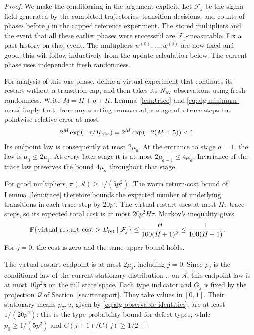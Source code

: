 \begin{proof}
We make the conditioning in the argument explicit.  Let
\(\mathcal F_j\) be the sigma-field generated by the completed
trajectories, transition decisions, and counts of phases before
\(j\) in the capped reference experiment.  The stored multipliers
and the event that all these earlier phases were successful are
\(\mathcal F_j\)-measurable.  Fix a past history on that event.
The multipliers \(w^{(0)},\ldots,w^{(j)}\) are now fixed and good;
this will follow inductively from the update calculation below.
The current phase uses independent fresh randomness.

For analysis of this one phase, define a virtual experiment that
continues its restart without a transition cap, and then takes its
\(N_{\rm av}\) observations using fresh randomness.  Write
\(M=H+p+K\).  Lemma~\ref{lem:trace} and
\eqref{eq:alg-minimum-mass} imply that, from any starting
transversal, a stage of \(\tau\) trace steps has pointwise relative
error at most
\[
 2^M\exp(-\tau/K_{\rm obs})
 =2^M\exp(-2(M+5))<1.
\]
Its endpoint law is consequently at most \(2\mu_a\).
At the entrance to stage \(a=1\), the law is
\(\mu_0\leq 2\mu_1\).  At every later stage it is at most
\(2\mu_{a-1}\leq 4\mu_a\).  Invariance of the trace law preserves
the bound \(4\mu_a\) throughout that stage.

For good multipliers, \(\pi(\mathcal A)\geq 1/(5p^2)\).
The warm return-cost bound of Lemma~\ref{lem:trace} therefore
bounds the expected number of underlying transitions in each trace
step by \(20p^2\).  The virtual restart uses at most \(H\tau\)
trace steps, so its expected total cost is at most
\(20p^2H\tau\).  Markov's inequality gives
\begin{equation}
 \mathbb P\{\text{virtual restart cost}>B_{\rm ret}
                \mid\mathcal F_j\}
 \leq \frac{H}{100(H+1)^2}
 \leq \frac{1}{100(H+1)}.
 \label{eq:alg-cap-probability}
\end{equation}
For \(j=0\), the cost is zero and the same upper bound holds.

The virtual restart endpoint is at most \(2\mu_j\), including
\(j=0\).  Since \(\mu_j\) is the conditional law of the current
stationary distribution \(\pi\) on \(\mathcal A\), this endpoint
law is at most \(10p^2\pi\) on the full state space.
Each type indicator and \(G_j\) is fixed by the projection
\(\mathcal Q\) of Section~\ref{sec:transport}.  They take values
in \([0,1]\).  Their stationary means \(p_T,u\), given by
\eqref{eq:alg-observable-identities}, are at least \(1/(20p^2)\):
this is the type probability bound for defect types, while
\(p_0\geq 1/(5p^2)\) and \(C(j+1)/C(j)\geq 1/2\).


\end{proof}
